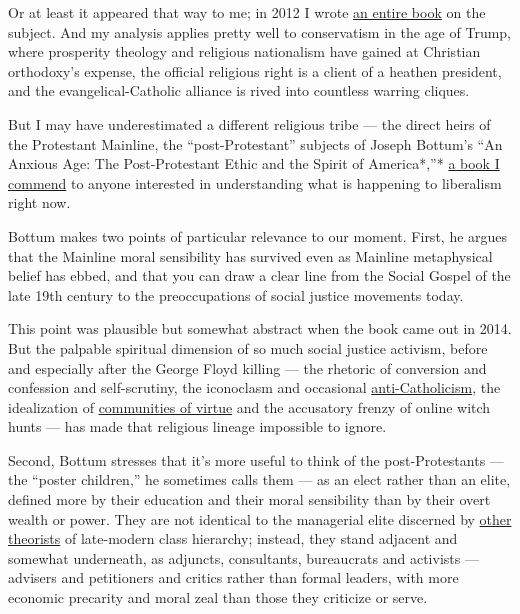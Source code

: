 Or at least it appeared that way to me; in 2012 I wrote
\href{https://www.simonandschuster.com/books/Bad-Religion/Ross-Douthat/9781439178331}{an
entire book} on the subject. And my analysis applies pretty well to
conservatism in the age of Trump, where prosperity theology and
religious nationalism have gained at Christian orthodoxy's expense, the
official religious right is a client of a heathen president, and the
evangelical-Catholic alliance is rived into countless warring cliques.

But I may have underestimated a different religious tribe --- the direct
heirs of the Protestant Mainline, the ``post-Protestant'' subjects of
Joseph Bottum's ``An Anxious Age: The Post-Protestant Ethic and the
Spirit of America*,''*
\href{https://www.penguinrandomhouse.com/books/16449/an-anxious-age-by-joseph-bottum/}{a
book I commend} to anyone interested in understanding what is happening
to liberalism right now.

Bottum makes two points of particular relevance to our moment. First, he
argues that the Mainline moral sensibility has survived even as Mainline
metaphysical belief has ebbed, and that you can draw a clear line from
the Social Gospel of the late 19th century to the preoccupations of
social justice movements today.

This point was plausible but somewhat abstract when the book came out in
2014. But the palpable spiritual dimension of so much social justice
activism, before and especially after the George Floyd killing --- the
rhetoric of conversion and confession and self-scrutiny, the iconoclasm
and occasional
\href{https://www.sacbee.com/news/local/article244012732.html}{anti-Catholicism},
the idealization of
\href{https://www.tabletmag.com/sections/news/articles/love-and-the-police}{communities
of virtue} and the accusatory frenzy of online witch hunts --- has made
that religious lineage impossible to ignore.

Second, Bottum stresses that it's more useful to think of the
post-Protestants --- the ``poster children,'' he sometimes calls them
--- as an elect rather than an elite, defined more by their education
and their moral sensibility than by their overt wealth or power. They
are not identical to the managerial elite discerned by
\href{https://americanaffairsjournal.org/2017/05/new-class-war/}{other
theorists} of late-modern class hierarchy; instead, they stand adjacent
and somewhat underneath, as adjuncts, consultants, bureaucrats and
activists --- advisers and petitioners and critics rather than formal
leaders, with more economic precarity and moral zeal than those they
criticize or serve.

